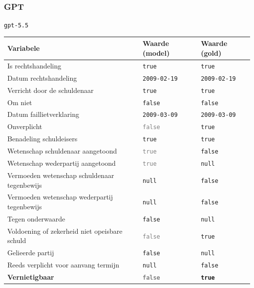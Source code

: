 \documentclass[
  dutch,
  a4paper,
]{article}
\begin{document}
\newpage


\subsubsection{GPT}\label{gpt-29}

\texttt{gpt-5.5}

\begin{center}
\small
\begin{tabular}{@{}p{7.4cm}p{2.6cm}p{2.6cm}@{}}
\toprule
Variabele & Waarde (model) & Waarde (gold) \\
\midrule
Is rechtshandeling & \texttt{true} & \texttt{true} \\
Datum rechtshandeling & \texttt{2009-02-19} & \texttt{2009-02-19} \\
Verricht door de schuldenaar & \texttt{true} & \texttt{true} \\
Om niet & \texttt{false} & \texttt{false} \\
Datum faillietverklaring & \texttt{2009-03-09} & \texttt{2009-03-09} \\
Onverplicht & \textcolor{gray}{\texttt{false}} & \texttt{true} \\
Benadeling schuldeisers & \texttt{true} & \texttt{true} \\
Wetenschap schuldenaar aangetoond & \textcolor{gray}{\texttt{true}} & \texttt{false} \\
Wetenschap wederpartij aangetoond & \textcolor{gray}{\texttt{true}} & \texttt{null} \\
Vermoeden wetenschap schuldenaar tegenbewijs & \texttt{null} & \texttt{false} \\
Vermoeden wetenschap wederpartij tegenbewijs & \texttt{null} & \texttt{false} \\
Tegen onderwaarde & \texttt{false} & \texttt{null} \\
Voldoening of zekerheid niet opeisbare schuld & \textcolor{gray}{\texttt{false}} & \texttt{true} \\
Gelieerde partij & \texttt{false} & \texttt{null} \\
Reeds verplicht voor aanvang termijn & \texttt{null} & \texttt{false} \\
\textbf{Vernietigbaar} & \textbf{\textcolor{gray}{\texttt{false}}} & \textbf{\texttt{true}} \\
\bottomrule
\end{tabular}
\end{center}
\end{document}
